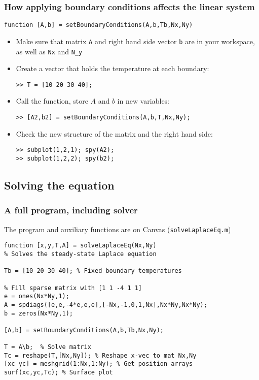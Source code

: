 \begin{frame}[fragile]
  \frametitle{How applying boundary conditions affects the linear system}
  \begin{lstlisting}[]
function [A,b] = setBoundaryConditions(A,b,Tb,Nx,Ny)
  \end{lstlisting}
  \pause
  \begin{itemize}
    \item Make sure that matrix \lstinline$A$ and right hand side vector \lstinline$b$ are in your workspace, as well as \lstinline$Nx$ and \lstinline$N_y$
    \item Create a vector that holds the temperature at each boundary:
    \begin{lstlisting}
>> T = [10 20 30 40];
    \end{lstlisting}
    \item Call the function, store $A$ and $b$ in new variables:
    \begin{lstlisting}
>> [A2,b2] = setBoundaryConditions(A,b,T,Nx,Ny);
    \end{lstlisting}
    \item Check the new structure of the matrix and the right hand side:
    \begin{lstlisting}
>> subplot(1,2,1); spy(A2);
>> subplot(1,2,2); spy(b2);
    \end{lstlisting}
  \end{itemize}
\end{frame}

\subsection*{Solving the equation}
\begin{frame}[fragile]
  \frametitle{A full program, including solver}
  The program and auxiliary functions are on Canvas (\lstinline$solveLaplaceEq.m$)
  \begin{lstlisting}[linewidth=1.05\textwidth]
function [x,y,T,A] = solveLaplaceEq(Nx,Ny)
% Solves the steady-state Laplace equation 

Tb = [10 20 30 40]; % Fixed boundary temperatures

% Fill sparse matrix with [1 1 -4 1 1]
e = ones(Nx*Ny,1);
A = spdiags([e,e,-4*e,e,e],[-Nx,-1,0,1,Nx],Nx*Ny,Nx*Ny);
b = zeros(Nx*Ny,1);

[A,b] = setBoundaryConditions(A,b,Tb,Nx,Ny);

T = A\b;  % Solve matrix
Tc = reshape(T,[Nx,Ny]); % Reshape x-vec to mat Nx,Ny
[xc yc] = meshgrid(1:Nx,1:Ny); % Get position arrays
surf(xc,yc,Tc); % Surface plot
  \end{lstlisting}
\end{frame}
  
